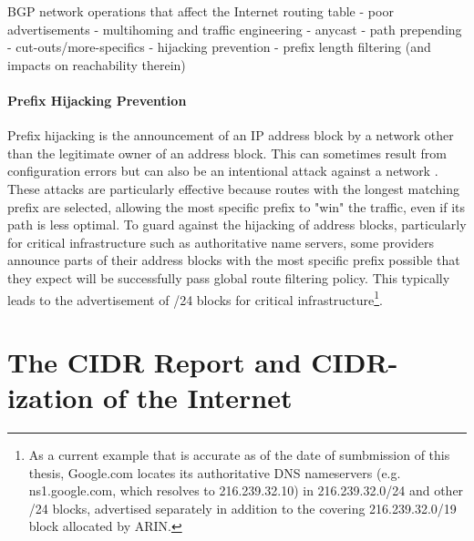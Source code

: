 BGP network operations that affect the Internet routing table
       - poor advertisements
       - multihoming and traffic engineering
	- anycast
	- path prepending
	- cut-outs/more-specifics
       - hijacking prevention
       - prefix length filtering (and impacts on reachability therein)

\paragraph{Prefix Hijacking Prevention}

Prefix hijacking is the announcement of an IP address block by a network other than the legitimate owner of an address block. This can sometimes result from configuration errors \cite{Brown:2008hc} but can also be an intentional attack against a network \cite{Pilosov:2008ij}. These attacks are particularly effective because routes with the longest matching prefix are selected, allowing the most specific prefix to "win" the traffic, even if its path is less optimal. To guard against the hijacking of address blocks, particularly for critical infrastructure such as authoritative name servers, some providers announce parts of their address blocks with the most specific prefix possible that they expect will be successfully pass global route filtering policy. This typically leads to the advertisement of /24 blocks for critical infrastructure\footnote{As a current example that is accurate as of the date of sumbmission of this thesis, Google.com locates its authoritative DNS nameservers (e.g. ns1.google.com, which resolves to 216.239.32.10) in 216.239.32.0/24 and other /24 blocks, advertised separately in addition to the covering 216.239.32.0/19 block allocated by ARIN.}.

%
%
%

\section{The CIDR Report and CIDR-ization of the Internet}

